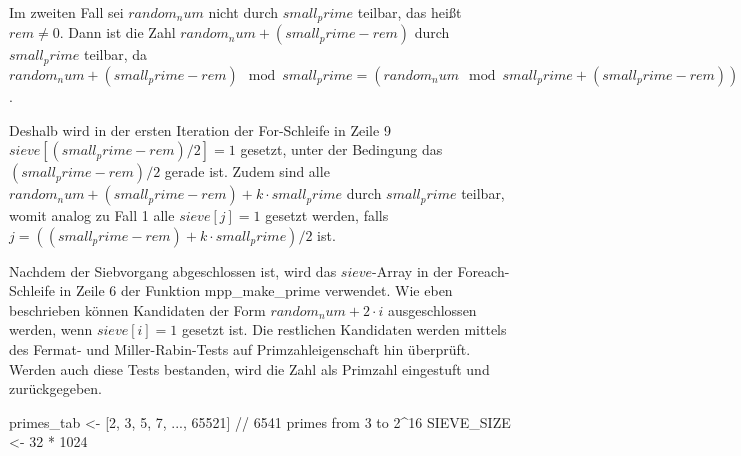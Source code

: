 Im zweiten Fall sei $random_num$ nicht durch $small_prime$ teilbar, das heißt $rem \neq 0$.
Dann ist die Zahl $random_num + (small_prime - rem)$ durch $small_prime$ teilbar, da $random_num + (small_prime - rem) \mod small_prime = (random_num \mod small_prime + (small_prime - rem)) \mod small_prime = (rem + (small_prime - rem)) = 0$.

Deshalb wird in der ersten Iteration der For-Schleife in Zeile 9 $sieve[(small_prime - rem)/2] = 1$ gesetzt, unter der Bedingung das $(small_prime - rem)/2$ gerade ist.
Zudem sind alle $random_num + (small_prime - rem) + k \cdot small_prime$ durch $small_prime$ teilbar, womit analog zu Fall 1 alle $sieve[j] = 1$ gesetzt werden, falls $j = ((small_prime - rem) + k \cdot small_prime) / 2$ ist.



\begin{algorithm}[h]
\DontPrintSemicolon
\caption{Pseudo-Code für mpp_sieve in Mozilla NSS}
\label{alg:sievePrimeGenerationNSS}
\end{algorithm}

Nachdem der Siebvorgang abgeschlossen ist, wird das $sieve$-Array in der Foreach-Schleife in Zeile 6 der Funktion mpp_make_prime verwendet.
Wie eben beschrieben können Kandidaten der Form $random_num + 2 \cdot i$ ausgeschlossen werden, wenn $sieve[i] = 1$ gesetzt ist.
Die restlichen Kandidaten werden mittels des Fermat- und Miller-Rabin-Tests auf Primzahleigenschaft hin überprüft.
Werden auch diese Tests bestanden, wird die Zahl als Primzahl eingestuft und zurückgegeben.

\begin{algorithm}[h]
\DontPrintSemicolon
\caption{Pseudo-Code für mpp_make_prime in Mozilla NSS}
\label{alg:makePrimeGenerationNSS}
primes_tab <- [2, 3, 5, 7, ..., 65521] // 6541 primes from 3 to 2^16\;
SIEVE_SIZE <- 32 * 1024\;

\end{algorithm}

